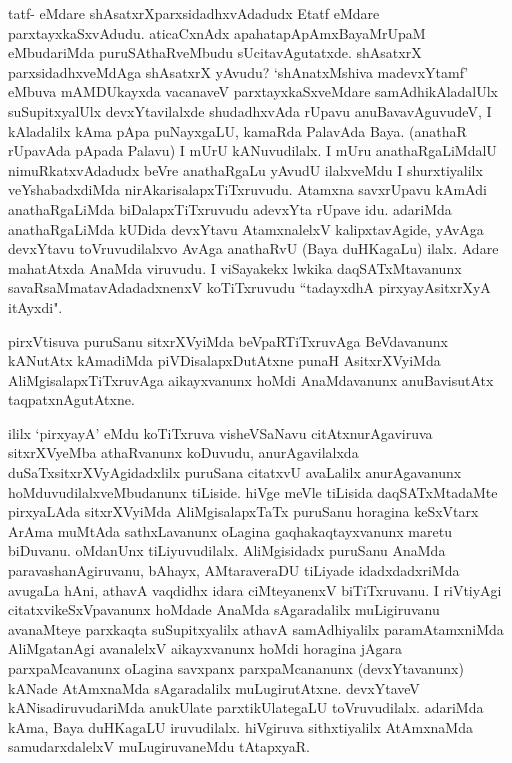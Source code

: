 
\begin{artha}
tatf- eMdare shAsatxrXparxsidadhxvAdadudx Etatf eMdare parxtayxkaSxvAdudu. aticaCxnAdx apahatapApAmx\s BayaMrUpaM eMbudariMda puruSAthaRveMbudu sUcitavAgutatxde. shAsatxrX parxsidadhxveMdAga shAsatxrX yAvudu?  `shAnatxMshiva madevxYtamf' eMbuva mAMDUkayxda vacanaveV parxtayxkaSxveMdare samAdhikAladalUlx suSupitxyalUlx devxYtavilalxde shudadhxvAda rUpavu anuBavavAguvudeV, I kAladalilx kAma pApa puNayxgaLU, kamaRda PalavAda Baya. (anathaR rUpavAda pApada Palavu) I mUrU kANuvudilalx. I mUru anathaRgaLiMdalU nimuRkatxvAdadudx beVre anathaRgaLu yAvudU ilalxveMdu I shurxtiyalilx veYshabadxdiMda nirAkarisalapxTiTxruvudu. Atamxna savxrUpavu kAmAdi anathaRgaLiMda biDalapxTiTxruvudu adevxYta rUpave idu. adariMda anathaRgaLiMda kUDida devxYtavu AtamxnalelxV kalipxtavAgide, yAvAga devxYtavu toVruvudilalxvo AvAga anathaRvU (Baya duHKagaLu) ilalx. Adare mahatAtxda AnaMda viruvudu. I viSayakekx lwkika daqSATxMtavanunx savaRsaMmatavAdadadxnenxV koTiTxruvudu ``tadayxdhA pirxyayAsitxrXyA itAyxdi".
\end{artha}

\begin{artha}%
pirxVtisuva puruSanu sitxrXVyiMda beVpaRTiTxruvAga BeVdavanunx kANutAtx kAmadiMda piVDisalapxDutAtxne punaH AsitxrXVyiMda AliMgisalapxTiTxruvAga aikayxvanunx hoMdi AnaMdavanunx anuBavisutAtx taqpatxnAgutAtxne. 
\end{artha}

\begin{artha}
ililx `pirxyayA' eMdu koTiTxruva visheVSaNavu citAtxnurAgaviruva sitxrXVyeMba athaRvanunx koDuvudu, anurAgavilalxda duSaTxsitxrXVyAgidadxlilx puruSana citatxvU avaLalilx anurAgavanunx hoMduvudilalxveMbudanunx tiLiside. hiVge meVle tiLisida daqSATxMtadaMte pirxyaLAda sitxrXVyiMda AliMgisalapxTaTx puruSanu horagina keSxVtarx ArAma muMtAda sathxLavanunx oLagina gaqhakaqtayxvanunx maretu biDuvanu. oMdanUnx tiLiyuvudilalx. AliMgisidadx puruSanu AnaMda paravashanAgiruvanu, bAhayx, AMtaraveraDU tiLiyade idadxdadxriMda avugaLa hAni, athavA vaqdidhx idara ciMteyanenxV biTiTxruvanu. I riVtiyAgi citatxvikeSxVpavanunx hoMdade AnaMda sAgaradalilx muLigiruvanu avanaMteye parxkaqta suSupitxyalilx athavA samAdhiyalilx paramAtamxniMda AliMgatanAgi avanalelxV aikayxvanunx hoMdi horagina jAgara parxpaMcavanunx oLagina savxpanx parxpaMcananunx (devxYtavanunx) kANade AtAmxnaMda sAgaradalilx muLugirutAtxne. devxYtaveV kANisadiruvudariMda anukUlate parxtikUlategaLU toVruvudilalx. adariMda kAma, Baya duHKagaLU iruvudilalx. hiVgiruva sithxtiyalilx AtAmxnaMda samudarxdalelxV muLugiruvaneMdu tAtapxyaR.
\end{artha}

